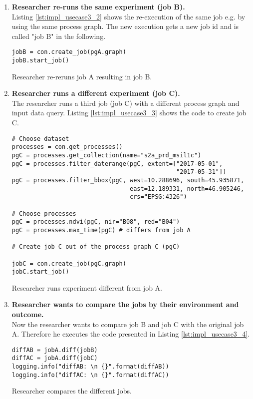\documentclass[draft,final]{vutinfth} %
\newenvironment{code}{\captionsetup{type=listing}}{}
\begin{document}
\begin{enumerate}
	\item \textbf{Researcher re-runs the same experiment (job B).}\\
	Listing \ref{lst:impl_usecase3_2} shows the re-execution of the same job e.g. by using the same process graph. The new execution gets a new job id and is called "job B" in the following.
\begin{code}
	\begin{verbatim}
jobB = con.create_job(pgA.graph)
jobB.start_job()
	\end{verbatim}
	\caption{Researcher re-reruns job A resulting in job B.}
	\label{lst:impl_usecase3_2}
\end{code}
	\item \textbf{Researcher runs a different experiment (job C).}\\
	The researcher runs a third job (job C) with a different process graph and input data query. Listing \ref{lst:impl_usecase3_3} shows the code to create job C. 
\begin{code}
	\begin{verbatim}
# Choose dataset
processes = con.get_processes()
pgC = processes.get_collection(name="s2a_prd_msil1c")
pgC = processes.filter_daterange(pgC, extent=["2017-05-01", 
                                              "2017-05-31"])
pgC = processes.filter_bbox(pgC, west=10.288696, south=45.935871, 
                                 east=12.189331, north=46.905246, 
                                 crs="EPSG:4326")
	
# Choose processes
pgC = processes.ndvi(pgC, nir="B08", red="B04")
pgC = processes.max_time(pgC) # differs from job A
	
# Create job C out of the process graph C (pgC)
	
jobC = con.create_job(pgC.graph)
jobC.start_job()
	\end{verbatim}
	\caption{Researcher runs experiment different from job A.}
	\label{lst:impl_usecase3_3}
	
\end{code}

	\item \textbf{Researcher wants to compare the jobs by their environment and outcome.}\\
	Now the researcher wants to compare job B and job C with the original job A. Therefore he executes the code presented in Listing \ref{lst:impl_usecase3_4}.
	
	\begin{code}
		\begin{verbatim}
diffAB = jobA.diff(jobB)
diffAC = jobA.diff(jobC)
logging.info("diffAB: \n {}".format(diffAB))
logging.info("diffAC: \n {}".format(diffAC))
		\end{verbatim}
		\caption{Researcher compares the different jobs.}
		\label{lst:impl_usecase3_4}
		

\end{code}
\end{enumerate}
\end{document}
